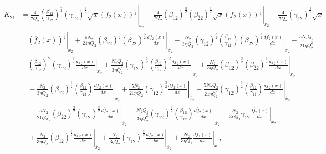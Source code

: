 \documentclass[fleqn]{article}
\begin{document}
            \begin{equation}
                \begin{split}
                    K_{\overline{2}1}&= \left.\frac{4}{7\overline{Q}_{2}} \left(\frac{\beta_{12}}{\gamma_{1\overline{2}}}\right)^\frac{5}{2} (\gamma_{1\overline{2}})^\frac{3}{2} \sqrt{x} (f_{2}(x))^\frac{5}{2} \right|_{x_{2}} - \left. \frac{4}{7 Q_{2}} (\beta_{12})^\frac{3}{2} (\beta_{\overline{2}2})^\frac{3}{2} \sqrt{x} (f_{2}(x))^\frac{5}{2} \right|_{x_{2}} - \frac{4}{7 \overline{Q}_{2}} (\gamma_{1\overline{2}})^\frac{3}{2} \sqrt{x} \\ & \quad \left. (\overline{f}_{2}(x))^\frac{5}{2} \right|_{\overline{x}_{2}}  + \left. \frac{5 N_{2}}{21 \eta Q_{2}} (\beta_{12})^\frac{3}{2} (\beta_{\overline{2}2})^\frac{3}{2} \frac{df_{2}(x)}{dx} \right|_{x_{2}} - \left. \frac{N_{2}}{3 \eta \overline{Q}_{2}} (\gamma_{1\overline{2}})^\frac{3}{2} \left(\frac{\beta_{12}}{\gamma_{1\overline{2}}}\right) (\beta_{\overline{2}2})^\frac{3}{2} \frac{df_{2}(x)}{dx} \right|_{x_{2}} -  \frac{5 N_{2} Q_{2}}{21 \eta \overline{Q}_{2}^2 } \\ & \quad \left(\frac{\beta_{12}}{\gamma_{1\overline{2}}}\right)^2 (\gamma_{1\overline{2}})^\frac{3}{2} \left. \frac{df_{2}(x)}{dx} \right|_{x_{2}}  + \left. \frac{N_{2} Q_{2}}{3 \eta \overline{Q}_{2}^2} (\gamma_{1\overline{2}})^\frac{3}{2} \left(\frac{\beta_{12}}{\gamma_{1\overline{2}}}\right)^2 \frac{df_{2}(x)}{dx} \right|_{x_{2}} + \left. \frac{N_{2}}{3 \eta Q_{2}} (\beta_{12})^\frac{3}{2} (\beta_{\overline{2}2})^\frac{3}{2} \frac{df_{2}(x)}{dx} \right|_{x_{2}} \\ & \quad - \left. \frac{N_{2}}{3 \eta \overline{Q}_{2}} (\beta_{12})^\frac{3}{2} \left(\frac{\beta_{12}}{\gamma_{1\overline{2}}}\right) \frac{df_{2}(x)}{dx} \right|_{x_{2}}  + \left. \frac{5\overline{N}_{2}}{21 \eta \overline{Q}_{2}} (\gamma_{1\overline{2}})^\frac{3}{2} \frac{d\overline{f}_{2}(x)}{dx} \right|_{\overline{x}_{2}}  + \left.  \frac{5 N_{2} Q_{2}}{21 \eta \overline{Q}_{2}^2} (\gamma_{1\overline{2}})^\frac{3}{2} \left(\frac{\beta_{12}}{\gamma_{1\overline{2}}}\right) \frac{d\overline{f}_{2}(x)}{dx} \right|_{\overline{x}_{2}} \\ & \quad - \left. \frac{5 N_{2}}{21 \eta \overline{Q}_{2}} (\beta_{\overline{2}2})^\frac{3}{2} (\gamma_{1\overline{2}})^\frac{3}{2} \frac{d\overline{f}_{2}(x)}{dx}\right|_{\overline{x}_{2}}  - \left. \frac{N_{2}Q_{2}}{3 \eta \overline{Q}_{2}^2} (\gamma_{1\overline{2}})^\frac{3}{2} \left(\frac{\beta_{12}}{\gamma_{1\overline{2}}}\right) \frac{d\overline{f}_{2}(x)}{dx} \right|_{\overline{x}_{2}} - \left. \frac{\overline{N}_{2}}{3 \eta Q_1} \gamma_{1\overline{2}} \frac{d\overline{f}_{2}(x)}{dx} \right|_{\overline{x}_{2}}  \\ & \quad + \left. \frac{N_{2}}{3 \eta \overline{Q}_{2}} (\beta_{12})^\frac{3}{2} \frac{d\overline{f}_{2}(x)}{dx} \right|_{\overline{x}_{2}} + \left. \frac{\overline{N}_{2}}{3 \eta \overline{Q}_{2}} (\gamma_{1\overline{2}})^\frac{3}{2} \frac{d\overline{f}_{2}(x)}{dx}\right|_{\overline{x}_{2}} + \left. \frac{\overline{N}_{2}}{3 \eta Q_1} \frac{df_1(x)}{dx} \right|_{x_1},
                \end{split}
            \label{eqn:k2bar1_caseII}
           \end{equation}       
\end{document}
